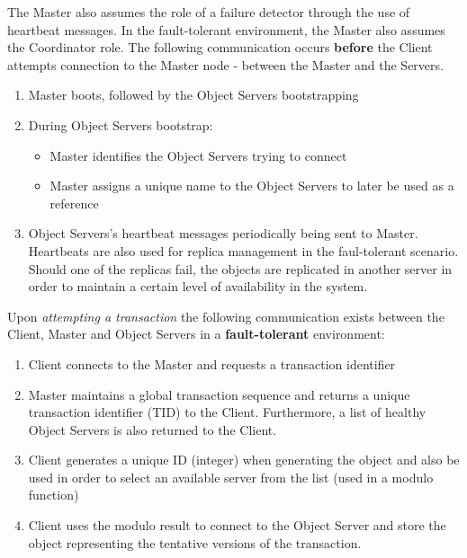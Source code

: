 \documentclass[times, 10pt,twocolumn]{article}
\begin{document}
The Master also assumes the role of a failure detector through the use of heartbeat messages. In the fault-tolerant environment, the Master also assumes the Coordinator role.
\label{sec:algor}
The following communication occurs {\bf before} the Client attempts connection to the Master node - between the Master and the Servers.

\begin{enumerate}
\item Master boots, followed by the Object Servers bootstrapping
\item During Object Servers bootstrap:
\begin{itemize}[noitemsep, nolistsep]
\item Master identifies the Object Servers trying to connect
\item Master assigns a unique name to the Object Servers to later be used as a reference
\end{itemize}
\item Object Servers's heartbeat messages periodically being sent to Master. Heartbeats are also used for replica management in the faul-tolerant scenario. Should one of the replicas fail, the objects are replicated in another server in order to maintain a certain level of availability in the system.
\end{enumerate}

Upon {\it attempting a transaction} the following communication exists between the Client, Master and Object Servers in a {\bf fault-tolerant} environment: 
\begin{enumerate}
\item Client connects to the Master and requests a transaction identifier 
\item Master maintains a global transaction sequence and returns a unique transaction identifier (TID) to the Client. Furthermore, a list of healthy Object Servers is also returned to the Client. 
\item Client generates a unique ID (integer) when generating the object and also be used in order to select an available server from the list (used in a modulo function)
\item Client uses the modulo result to connect to the Object Server and store the object representing the tentative versions of the transaction.
\end{enumerate}
\end{document}
